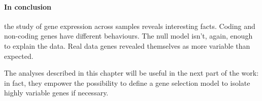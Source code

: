 \paragraph{In conclusion} the study of gene expression across samples reveals interesting facts. Coding and non-coding genes have different behaviours. The null model isn't, again, enough to explain the data. Real data genes revealed themselves as more variable than expected.

The analyses described in this chapter will be useful in the next part of the work: in fact, they empower the possibility to define a gene selection model to isolate highly variable genes if necessary.